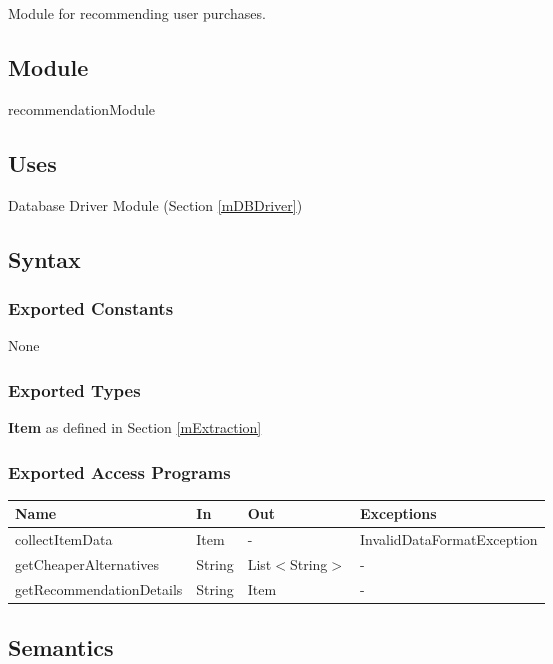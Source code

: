\documentclass[12pt, titlepage]{article}
\begin{document}
Module for recommending user purchases.

\subsection{Module}

recommendationModule

\subsection{Uses}

Database Driver Module (Section \ref{mDBDriver})

\subsection{Syntax}

\subsubsection{Exported Constants}

None

\subsubsection{Exported Types}

\textbf{Item} as defined in Section \ref{mExtraction} \\

\subsubsection{Exported Access Programs}

\begin{center}
    \begin{tabular}{p{5cm} p{4cm} p{3cm} p{4cm}}
    \hline
    \textbf{Name} & \textbf{In} & \textbf{Out} & \textbf{Exceptions} \\
    \hline
    collectItemData & Item & - & InvalidDataFormatException \\
    getCheaperAlternatives & String & List$<$String$>$ & - \\
    getRecommendationDetails & String & Item & - \\
    \hline
    \end{tabular}
\end{center}

\subsection{Semantics}
\end{document}
